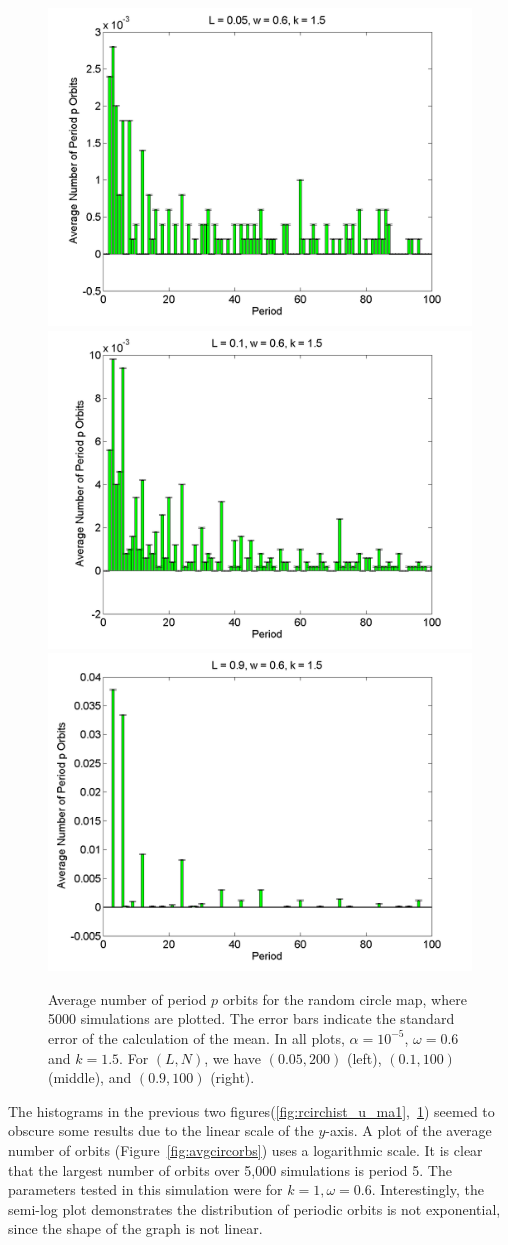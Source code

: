\begin{figure}[H]\linespread{1}
\caption[Average number of period $p$ orbits for the random circle
map (uniform distribution), for $\alpha=10^{-5}$, $\omega=0.6$ and $k=1.5$]{Average number of period $p$ orbits for the random circle
map, where 5000 simulations are plotted. The error bars indicate
the standard error of the calculation of the mean. In all plots,
$\alpha = 10^{-5}$, $\omega=0.6$ and $k=1.5$. For $(L,N)$,
we have $(0.05, 200)$ (left), $(0.1, 100)$
(middle), and $(0.9, 100)$ (right).}\label{fig:rcirchist_u_ma2}
	\begin{center}	\includegraphics[width=.33\textwidth]{figs/rcirc_hist_u_L_005_w_06_k_15_sims_5000.png}\hfill
\includegraphics[width=.33\textwidth]{figs/rcirc_hist_u_L_01_w_06_k_15_sims_5000.png}\hfill
\includegraphics[width=.33\textwidth]{figs/rcirc_hist_u_L_09_w_06_k_15_sims_5000.png}
	\end{center}
\end{figure}

The histograms in the previous two
figures(\ref{fig:rcirchist_u_ma1},~\ref{fig:rcirchist_u_ma2}) seemed
to obscure some results due to the linear scale of the $y$-axis. A plot of the average number of orbits
(Figure~\ref{fig:avgcircorbs}) uses a logarithmic scale. It is clear
that the largest number of orbits over 5,000
simulations is period 5. The parameters tested in this simulation were
for $k=1, \omega=0.6$. Interestingly, the
semi-log plot demonstrates the distribution of periodic orbits is not
exponential, since the shape of the graph is not linear.

